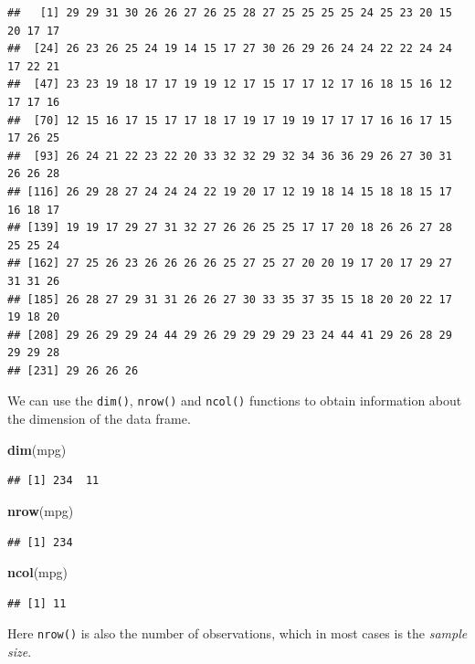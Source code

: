 \documentclass[]{book}
\newenvironment{Shaded}{\begin{snugshade}}{\end{snugshade}}
\newcommand{\KeywordTok}[1]{\textcolor[rgb]{0.13,0.29,0.53}{\textbf{#1}}}
\newcommand{\NormalTok}[1]{#1}
\theoremstyle{definition}
\theoremstyle{definition}
\theoremstyle{definition}
\theoremstyle{remark}
\begin{document}
\begin{verbatim}
##   [1] 29 29 31 30 26 26 27 26 25 28 27 25 25 25 25 24 25 23 20 15 20 17 17
##  [24] 26 23 26 25 24 19 14 15 17 27 30 26 29 26 24 24 22 22 24 24 17 22 21
##  [47] 23 23 19 18 17 17 19 19 12 17 15 17 17 12 17 16 18 15 16 12 17 17 16
##  [70] 12 15 16 17 15 17 17 18 17 19 17 19 19 17 17 17 16 16 17 15 17 26 25
##  [93] 26 24 21 22 23 22 20 33 32 32 29 32 34 36 36 29 26 27 30 31 26 26 28
## [116] 26 29 28 27 24 24 24 22 19 20 17 12 19 18 14 15 18 18 15 17 16 18 17
## [139] 19 19 17 29 27 31 32 27 26 26 25 25 17 17 20 18 26 26 27 28 25 25 24
## [162] 27 25 26 23 26 26 26 26 25 27 25 27 20 20 19 17 20 17 29 27 31 31 26
## [185] 26 28 27 29 31 31 26 26 27 30 33 35 37 35 15 18 20 20 22 17 19 18 20
## [208] 29 26 29 29 24 44 29 26 29 29 29 29 23 24 44 41 29 26 28 29 29 29 28
## [231] 29 26 26 26
\end{verbatim}

We can use the \texttt{dim()}, \texttt{nrow()} and \texttt{ncol()}
functions to obtain information about the dimension of the data frame.

\begin{Shaded}
\begin{Highlighting}[]
\KeywordTok{dim}\NormalTok{(mpg)}
\end{Highlighting}
\end{Shaded}

\begin{verbatim}
## [1] 234  11
\end{verbatim}

\begin{Shaded}
\begin{Highlighting}[]
\KeywordTok{nrow}\NormalTok{(mpg)}
\end{Highlighting}
\end{Shaded}

\begin{verbatim}
## [1] 234
\end{verbatim}

\begin{Shaded}
\begin{Highlighting}[]
\KeywordTok{ncol}\NormalTok{(mpg)}
\end{Highlighting}
\end{Shaded}

\begin{verbatim}
## [1] 11
\end{verbatim}

Here \texttt{nrow()} is also the number of observations, which in most
cases is the \emph{sample size}.
\end{document}
